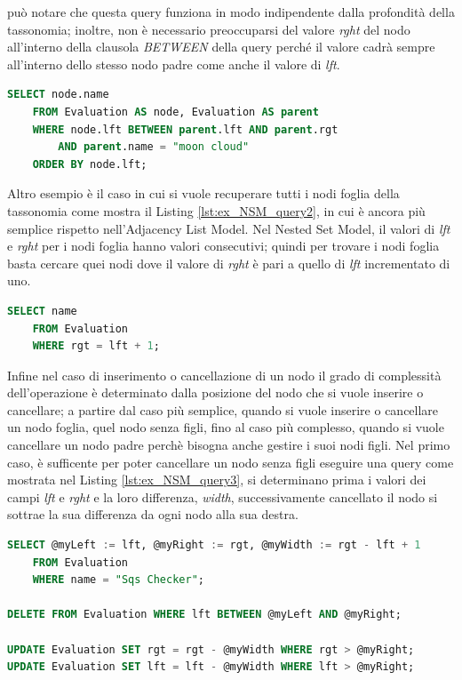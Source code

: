 può notare che questa query funziona in modo indipendente dalla profondità della tassonomia; inoltre, non è necessario preoccuparsi del valore \textit{rght} 
del nodo all'interno della clausola \textit{BETWEEN} della query perché il valore cadrà sempre all'interno dello stesso nodo padre come anche il 
valore di \textit{lft}.
\begin{lstlisting}[language=SQL, label=lst:ex_NSM_query, caption={Query in puro Sql per recuperare l'intera tassonomia delle Evaluation, 
    secondo il Nested Set Model.}]
SELECT node.name
    FROM Evaluation AS node, Evaluation AS parent
    WHERE node.lft BETWEEN parent.lft AND parent.rgt
        AND parent.name = "moon cloud"
    ORDER BY node.lft;
\end{lstlisting}
Altro esempio è il caso in cui si vuole recuperare tutti i nodi foglia della tassonomia come mostra il Listing \ref{lst:ex_NSM_query2}, in cui è ancora 
più semplice rispetto nell'Adjacency List Model. Nel Nested Set Model, il valori di \textit{lft} e \textit{rght} per i nodi foglia hanno valori 
consecutivi; quindi per trovare i nodi foglia basta cercare quei nodi dove il valore di \textit{rght} è pari a quello di \textit{lft} incrementato di uno.
\begin{lstlisting}[language=SQL, label=lst:ex_NSM_query2, caption={Query in puro Sql per recuperare tutti i nodi foglia della tassonomia delle Evaluation, 
    secondo il Nested Set Model.}]
SELECT name
    FROM Evaluation
    WHERE rgt = lft + 1;
\end{lstlisting}
Infine nel caso di inserimento o cancellazione di un nodo il grado di complessità dell'operazione è determinato dalla posizione del nodo che si 
vuole inserire o cancellare; a partire dal caso più semplice, quando si vuole inserire o cancellare un nodo foglia, quel nodo senza figli, fino 
al caso più complesso, quando si vuole cancellare un nodo padre perchè bisogna anche gestire i suoi nodi figli.
Nel primo caso, è sufficente per poter cancellare un nodo senza figli eseguire una query come mostrata nel Listing \ref{lst:ex_NSM_query3}, si determinano 
prima i valori dei campi \textit{lft} e \textit{rght} e la loro differenza, \textit{width}, successivamente cancellato il nodo si sottrae la sua 
differenza da ogni nodo alla sua destra.
\begin{lstlisting}[language=SQL, label=lst:ex_NSM_query3, caption={Query in puro Sql per eliminare un nodo foglia dalla tassonomia delle Evaluation, 
    secondo il Nested Set Model.}]
SELECT @myLeft := lft, @myRight := rgt, @myWidth := rgt - lft + 1
    FROM Evaluation
    WHERE name = "Sqs Checker";

DELETE FROM Evaluation WHERE lft BETWEEN @myLeft AND @myRight;

UPDATE Evaluation SET rgt = rgt - @myWidth WHERE rgt > @myRight;
UPDATE Evaluation SET lft = lft - @myWidth WHERE lft > @myRight;
\end{lstlisting}
